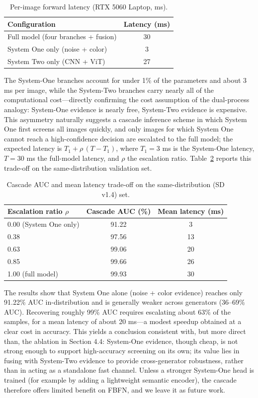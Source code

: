 \documentclass[11pt,a4paper]{article}
\begin{document}
\begin{table}[h]
\centering
\caption{Per-image forward latency (RTX 5060 Laptop, ms).}
\label{tab:latency}
\begin{tabular}{lc}
\toprule
Configuration & Latency (ms) \\
\midrule
Full model (four branches + fusion) & 30 \\
System One only (noise + color) & 3 \\
System Two only (CNN + ViT) & 27 \\
\bottomrule
\end{tabular}
\end{table}

The System-One branches account for under 1\% of the parameters and about 3 ms per image, while the System-Two branches carry nearly all of the computational cost---directly confirming the cost assumption of the dual-process analogy: System-One evidence is nearly free, System-Two evidence is expensive. This asymmetry naturally suggests a cascade inference scheme in which System One first screens all images quickly, and only images for which System One cannot reach a high-confidence decision are escalated to the full model; the expected latency is $T_1 + \rho\,(T - T_1)$, where $T_1 = 3$ ms is the System-One latency, $T = 30$ ms the full-model latency, and $\rho$ the escalation ratio. Table~\ref{tab:cascade} reports this trade-off on the same-distribution validation set.

\begin{table}[h]
\centering
\caption{Cascade AUC and mean latency trade-off on the same-distribution (SD v1.4) set.}
\label{tab:cascade}
\begin{tabular}{lcc}
\toprule
Escalation ratio $\rho$ & Cascade AUC (\%) & Mean latency (ms) \\
\midrule
0.00 (System One only) & 91.22 & 3 \\
0.38 & 97.56 & 13 \\
0.63 & 99.06 & 20 \\
0.85 & 99.66 & 26 \\
1.00 (full model) & 99.93 & 30 \\
\bottomrule
\end{tabular}
\end{table}

The results show that System One alone (noise + color evidence) reaches only 91.22\% AUC in-distribution and is generally weaker across generators (36--69\% AUC). Recovering roughly 99\% AUC requires escalating about 63\% of the samples, for a mean latency of about 20 ms---a modest speedup obtained at a clear cost in accuracy. This yields a conclusion consistent with, but more direct than, the ablation in Section 4.4: System-One evidence, though cheap, is not strong enough to support high-accuracy screening on its own; its value lies in fusing with System-Two evidence to provide cross-generator robustness, rather than in acting as a standalone fast channel. Unless a stronger System-One head is trained (for example by adding a lightweight semantic encoder), the cascade therefore offers limited benefit on FBFN, and we leave it as future work.
\end{document}
